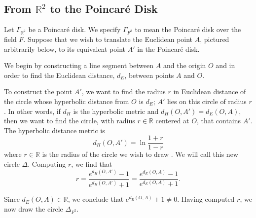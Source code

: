 \documentclass[12pt]{article}
\newcommand{\R}{\mathbb{R}}
\newcommand{\poincare}{Poincar\'{e} }
\theoremstyle{plain}
\theoremstyle{definition}
\begin{document}
\newpage
\begin{appendices}
\section{From $\R^2$ to the \poincare Disk} \label{appendixA}

Let $\Gamma_{\R^2}$ be a \poincare disk. We specify $\Gamma_{F^2}$ to mean the \poincare disk over the field $F$. Suppose that we wish to translate the Euclidean point $A$, pictured arbitrarily below, to its equivalent point $A'$ in the \poincare disk.

\begin{center}
\end{center}

We begin by constructing a line segment between $A$ and the origin $O$ and in order to find the Euclidean distance, $d_E$, between points $A$ and $O$.

\begin{center}
\end{center}

To construct the point $A'$, we want to find the radius $r$ in Euclidean distance of the circle whose hyperbolic distance from $O$ is $d_E$; $A'$ lies on this circle of radius $r$. In other words, if $d_H$ is the hyperbolic metric and $d_H(O,A') = d_E(O,A)$, then we want to find the circle, with radius $r\in\R$ centered at $O$, that contains $A'$. The hyperbolic distance metric is
\[
	d_H(O,A') = \ln\frac{1 + r}{1 - r}
\]
where $r\in\R$ is the radius of the circle we wish to draw \cite{hyperbolic_metric}. We will call this new circle $\Delta$. Computing $r$, we find that
\[
	r = \frac{e^{d_H(O,A')} - 1}{e^{d_H(O,A')} + 1} =  \frac{e^{d_E(O,A)} - 1}{e^{d_E(O,A)} + 1}.
\]

Since $d_E(O,A)\in\R$, we conclude that $e^{d_E(O,A)} + 1 \neq 0$. Having computed $r$, we now draw the circle $\Delta_{F^2}$.


\end{appendices}
\end{document}
